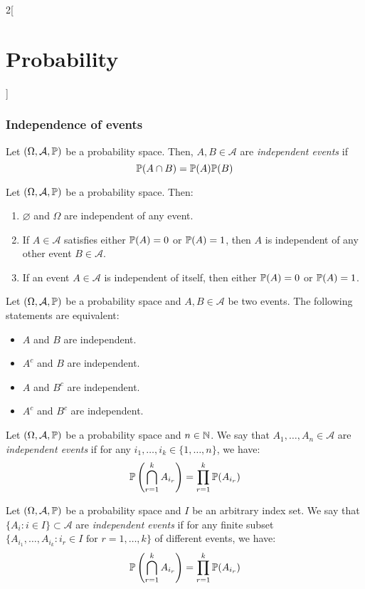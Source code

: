 \documentclass[../../../main.tex]{subfiles}
\begin{document}
\begin{multicols}{2}[\section{Probability}]
    \subsubsection{Independence of events}
    \begin{definition}
        Let $(\Omega,\mathcal{A},\mathbb{P})$ be a probability space. Then, $A,B\in\mathcal{A}$ are \textit{independent events} if $$\mathbb{P}(A\cap B)=\mathbb{P}(A)\mathbb{P}(B)$$
    \end{definition}
    \begin{prop}
        Let $(\Omega,\mathcal{A},\mathbb{P})$ be a probability space. Then:
        \begin{enumerate}
            \item $\varnothing$ and $\Omega$ are independent of any event.
            \item If $A\in\mathcal{A}$ satisfies either $\mathbb{P}(A)=0$ or $\mathbb{P}(A)=1$, then $A$ is independent of any other event $B\in\mathcal{A}$.
            \item If an event $A\in\mathcal{A}$ is independent of itself, then either $\mathbb{P}(A)=0$ or $\mathbb{P}(A)=1$.
        \end{enumerate}
    \end{prop}
    \begin{prop}
        Let $(\Omega,\mathcal{A},\mathbb{P})$ be a probability space and $A,B\in\mathcal{A}$ be two events. The following statements are equivalent:
        \begin{itemize}
            \item $A$ and $B$ are independent.
            \item $A^c$ and $B$ are independent.
            \item $A$ and $B^c$ are independent.
            \item $A^c$ and $B^c$ are independent.
        \end{itemize}
    \end{prop}
    \begin{definition}
        Let $(\Omega,\mathcal{A},\mathbb{P})$ be a probability space and $n\in\mathbb{N}$. We say that $A_1,\ldots,A_n\in\mathcal{A}$ are \textit{independent events} if for any $i_1,\ldots,i_k\in\{1,\ldots,n\}$, we have: $$\mathbb{P}\left(\bigcap_{r=1}^kA_{i_r}\right)=\prod_{r=1}^k\mathbb{P}(A_{i_r})$$
    \end{definition}
    \begin{definition}
        Let $(\Omega,\mathcal{A},\mathbb{P})$ be a probability space and $I$ be an arbitrary index set. We say that $\{A_i:i\in I\}\subset\mathcal{A}$ are \textit{independent events} if for any finite subset $\{A_{i_1},\ldots, A_{i_k}:i_r\in I\text{ for }r=1,\ldots,k\}$ of different events, we have: $$\mathbb{P}\left(\bigcap_{r=1}^kA_{i_r}\right)=\prod_{r=1}^k\mathbb{P}(A_{i_r})$$
    \end{definition}

\end{multicols}
\end{document}
